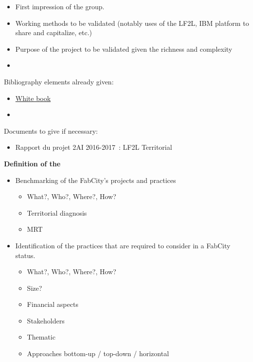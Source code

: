 \begin{tcolorbox}
	\begin{itemize}
		\item First impression of the group.
		\item Working methods to be validated (notably uses of the LF2L, IBM platform to share and capitalize, etc.)
		\item Purpose of the project to be validated given the richness and complexity
		\item 
	\end{itemize}

Bibliography elements already given:

\begin{itemize}
	\item \href{http://www.newpic.fr/wbopenlabs/anrt-newpic-livreblancopenlabs-hd.pdf}{White book }			
	\item {}
\end{itemize}


Documents to give if necessary:

\begin{itemize}
	\item Rapport du projet 2AI 2016-2017 : LF2L Territorial
\end{itemize}



\textbf{Definition of the }

	\begin{itemize}
		\item Benchmarking of the FabCity's projects and practices
			
			\begin{itemize}
				\item What?, Who?, Where?, How?
				\item Territorial diagnosis
				\item MRT				
			\end{itemize}
		
		\item Identification of the practices that are required to consider  in a FabCity status.

			\begin{itemize}
				\item What?, Who?, Where?, How?
				\item Size?
				\item Financial aspects
				\item Stakeholders
				\item Thematic	
				\item Approaches bottom-up / top-down / horizontal 
			

\end{itemize}
\end{itemize}
\end{tcolorbox}
